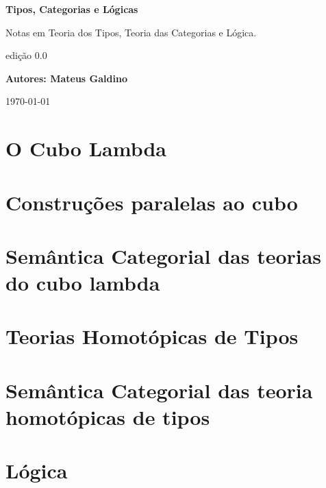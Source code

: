 \documentclass{article}
\theoremstyle{definition}
\begin{document}
    \begin{titlepage}
        \begin{center}
            \vspace*{1cm}
    
            \Huge
            \textbf{Tipos, Categorias e Lógicas}
    
            \vspace{0.5cm}
            \large
            Notas em Teoria dos Tipos, Teoria das Categorias e Lógica.
                  
            \vfill



            \Large
            edição \textbf{$0.0$}

            \textbf{Autores: Mateus Galdino}

            \today
                
        \end{center}
    \end{titlepage}

    \begingroup
        \hypersetup{hidelinks}    
        \tableofcontents

    \endgroup


    \newpage

        

    \newpage


        \part{O Cubo Lambda}
            \setcounter{section}{0}
            \renewcommand*{\theHsection}{chX.\the\value{section}}

            
            \newpage
            
            \newpage
            

    \newpage

        \part{Construções paralelas ao cubo}

    \newpage

        \part{Semântica Categorial das teorias do cubo lambda}

    \newpage

        \part{Teorias Homotópicas de Tipos}


    \newpage
        \part{Semântica Categorial das teoria homotópicas de tipos}

    \newpage   
        \part{Lógica}
    \newpage

    \newpage
\end{document}
